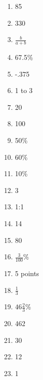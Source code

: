 \documentclass[../uilmath.tex]{subfiles}
\begin{document}
\begin{enumerate}[label=\bfseries\arabic*.]
    \item %
    85

    \item %
    330 

    \item %
    $\frac{b}{a+b}$

    \item %
    67.5\%

    \item %
    -.375

    \item %
    1 to 3 

    \item %
    20

    \item %
    100

    \item %
    50\%

    \item %
    60\%

    \item %
    10\%

    \item %
    3

    \item %
    1:1 

    \item %
    14

    \item %
    80

    \item %
    $\frac{3}{100}$\% 

    \item %
    5 points 

    \item %
    $\frac{1}{3}$

    \item %
    $46\frac{2}{3}$\%

    \item %
    462

    \item %
    30

    \item %
    12

    \item %
    1


\end{enumerate}
\end{document}
